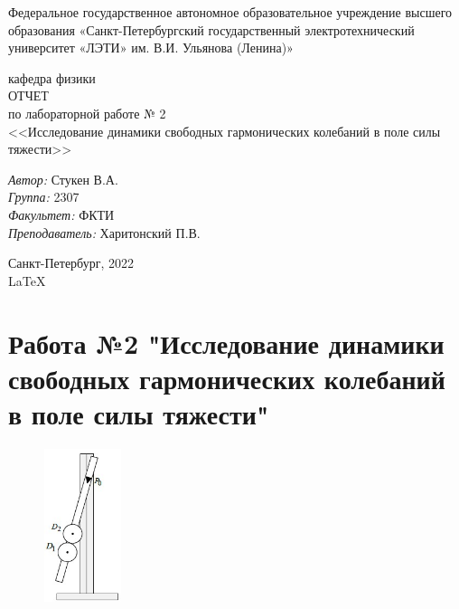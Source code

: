 \documentclass[a4paper,12pt]{report}
\begin{document}
 

\begin{titlepage} 

\begin{center} 

\large Федеральное государственное автономное образовательное учреждение высшего образования «Санкт-Петербургский государственный электротехнический университет «ЛЭТИ» им. В.И. Ульянова (Ленина)»
	
кафедра физики\\[5cm] 


\huge ОТЧЕТ\\ по лабораторной работе № 2\\[0.5cm] 
\large <<Исследование динамики свободных гармонических колебаний в поле силы тяжести>>\\[3.7cm]

\begin{minipage}{1\textwidth} 
    \begin{flushleft} 
        \emph{Автор:} Стукен В.А.\\
        \emph{Группа:} 2307\\
        \emph{Факультет:} ФКТИ\\
        \emph{Преподаватель:} Харитонский П.В. 
    \end{flushleft} 
\end{minipage} 

\vfill 

Санкт-Петербург, 2022\\
{\large \LaTeX} 

\end{center} 

\thispagestyle{empty} 
\end{titlepage} 

\section*{Работа №2 "Исследование динамики свободных гармонических колебаний в поле силы тяжести"}

\begin{figure}
    \includegraphics[width=0.2\textwidth]{ust.jpg}
    \label{ris:image}
\end{figure}
\end{document}
